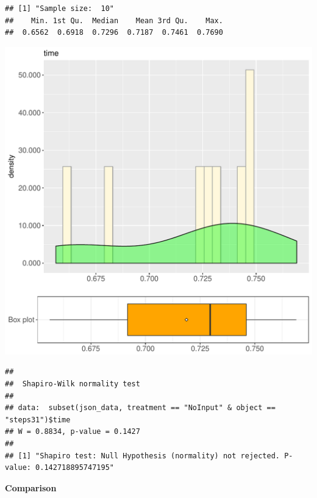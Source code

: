 \documentclass{article}\usepackage[]{graphicx}\usepackage[]{color}
\makeatletter
\def\maxwidth{ %
  \ifdim\Gin@nat@width>\linewidth
    \linewidth
  \else
    \Gin@nat@width
  \fi
}
\newenvironment{kframe}{%
 \def\at@end@of@kframe{}%
 \ifinner\ifhmode%
  \def\at@end@of@kframe{\end{minipage}}%
  \begin{minipage}{\columnwidth}%
 \fi\fi%
 \def\FrameCommand##1{\hskip\@totalleftmargin \hskip-\fboxsep
 \colorbox{shadecolor}{##1}\hskip-\fboxsep
     \hskip-\linewidth \hskip-\@totalleftmargin \hskip\columnwidth}%
 \MakeFramed {\advance\hsize-\width
   \@totalleftmargin\z@ \linewidth\hsize
   \@setminipage}}%
 {\par\unskip\endMakeFramed%
 \at@end@of@kframe}
\newenvironment{knitrout}{}{} %
\makeatother
\begin{document}
\begin{knitrout}
\color{fgcolor}\begin{kframe}
\begin{verbatim}
## [1] "Sample size:  10"
##    Min. 1st Qu.  Median    Mean 3rd Qu.    Max. 
##  0.6562  0.6918  0.7296  0.7187  0.7461  0.7690
\end{verbatim}
\end{kframe}
\includegraphics[width=\maxwidth]{figure/RH4_NoInput_steps31-1} 
\begin{kframe}\begin{verbatim}
## 
## 	Shapiro-Wilk normality test
## 
## data:  subset(json_data, treatment == "NoInput" & object == "steps31")$time
## W = 0.8834, p-value = 0.1427
## 
## [1] "Shapiro test: Null Hypothesis (normality) not rejected. P-value: 0.142718895747195"
\end{verbatim}
\end{kframe}
\end{knitrout}
  
 \textbf{Comparison}
  
\end{document}
